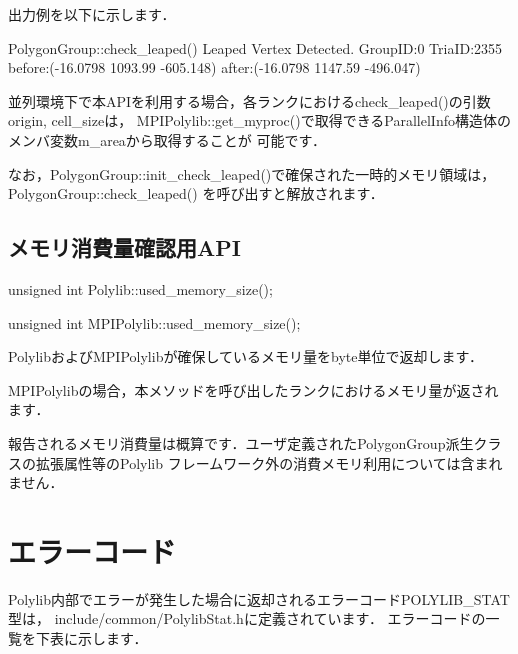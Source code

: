 {出力例を以下に示します．

\begin{program}
PolygonGroup::check_leaped() Leaped Vertex Detected. GroupID:0 TriaID:2355
 before:(-16.0798 1093.99 -605.148) after:(-16.0798 1147.59 -496.047)
\end{program}

並列環境下で本APIを利用する場合，各ランクにおけるcheck\_leaped()の引数origin, cell\_sizeは，
MPIPolylib::get\_myproc()で取得できるParallelInfo構造体のメンバ変数m\_areaから取得することが
可能です．

なお，PolygonGroup::init\_check\_leaped()で確保された一時的メモリ領域は，PolygonGroup::check\_leaped()
を呼び出すと解放されます．

%
\subsection{メモリ消費量確認用API}

\begin{program}
	unsigned int Polylib::used_memory_size();

	unsigned int MPIPolylib::used_memory_size();
\end{program}

PolylibおよびMPIPolylibが確保しているメモリ量をbyte単位で返却します．

MPIPolylibの場合，本メソッドを呼び出したランクにおけるメモリ量が返されます．

報告されるメモリ消費量は概算です．ユーザ定義されたPolygonGroup派生クラスの拡張属性等のPolylib
フレームワーク外の消費メモリ利用については含まれません．

\pagebreak

%
\section{エラーコード}

Polylib内部でエラーが発生した場合に返却されるエラーコードPOLYLIB\_STAT型は，
include/common/PolylibStat.hに定義されています．
エラーコードの一覧を下表に示します．

}
